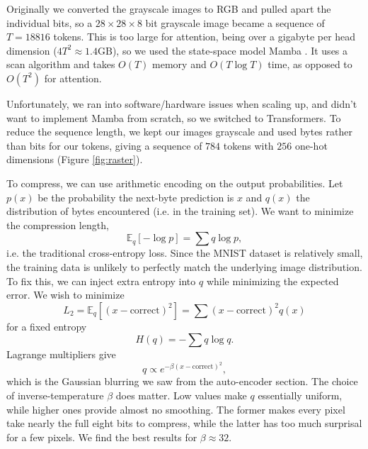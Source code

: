 \documentclass[11pt]{article}
\begin{document}
Originally we converted the grayscale images to RGB and pulled apart the individual bits, so a $28\times 28\times 8$ bit grayscale image became a sequence of $T=18816$ tokens. This is too large for attention, being over a gigabyte per head dimension ($4T^2\approx 1.4\mathrm{GB}$), so we used the state-space model Mamba \citep{gu-2023-mamba}. It uses a scan algorithm and takes $O(T)$ memory and $O(T\log T)$ time, as opposed to $O(T^2)$ for attention.

Unfortunately, we ran into software/hardware issues when scaling up, and didn't want to implement Mamba from scratch, so we switched to Transformers. To reduce the sequence length, we kept our images grayscale and used bytes rather than bits for our tokens, giving a sequence of $784$ tokens with $256$ one-hot dimensions (Figure \ref{fig:raster}).

To compress, we can use arithmetic encoding on the output probabilities. Let $p(x)$ be the probability the next-byte prediction is $x$ and $q(x)$ the distribution of bytes encountered (i.e. in the training set). We want to minimize the compression length,
$$\mathbb{E}_q[-\log p] = \sum q\log p,$$
i.e. the traditional cross-entropy loss. Since the MNIST dataset is relatively small, the training data is unlikely to perfectly match the underlying image distribution. To fix this, we can inject extra entropy into $q$ while minimizing the expected error. We wish to minimize
$$L_2 = \mathbb{E}_q[(x-\mathrm{correct})^2] = \sum (x-\mathrm{correct})^2q(x)$$
for a fixed entropy
$$H(q) = -\sum q\log q.$$
Lagrange multipliers give
$$q\propto e^{-\beta(x-\mathrm{correct})^2},$$
which is the Gaussian blurring we saw from the auto-encoder section. The choice of inverse-temperature $\beta$ does matter. Low values make $q$ essentially uniform, while higher ones provide almost no smoothing. The former makes every pixel take nearly the full eight bits to compress, while the latter has too much surprisal for a few pixels. We find the best results for $\beta\approx 32$.
\end{document}
